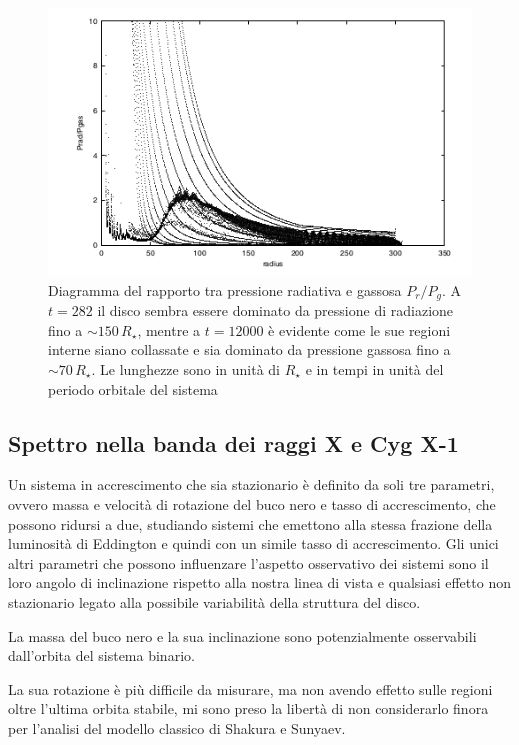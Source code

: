 \documentclass[a4paperbi]{article}
\begin{document}
	\begin{figure}[H]
		\centering
		\includegraphics[width=0.8\linewidth]{CollassoDisco2}
		\caption{Diagramma del rapporto tra pressione radiativa e gassosa $P_r/P_g$. A $t=282$ il disco sembra essere dominato da pressione di radiazione fino a $\sim150\,R_\star$, mentre a $t=12000$ è evidente come le sue regioni interne siano collassate e sia dominato da pressione gassosa fino a $\sim70\,R_\star$. Le lunghezze sono in unità di $R_\star$ e in tempi in unità del periodo orbitale del sistema}
		\label{fig:CollassoDisco2}
	\end{figure}
	
	\subsection{Spettro nella banda dei raggi X e Cyg X-1}
	 
	Un sistema in accrescimento che sia stazionario è definito da soli tre parametri, ovvero massa e velocità di rotazione del buco nero e tasso di accrescimento, che possono ridursi a due, studiando sistemi che emettono alla stessa frazione della luminosità di Eddington e quindi con un simile tasso di accrescimento. Gli unici altri parametri che possono influenzare l'aspetto osservativo dei sistemi sono il loro angolo di inclinazione rispetto alla nostra linea di vista e qualsiasi effetto non stazionario legato alla possibile variabilità della struttura del disco.
	
	La massa del buco nero e la sua inclinazione sono potenzialmente osservabili dall'orbita del sistema binario.
	
	La sua rotazione è più difficile da misurare, ma non avendo effetto sulle regioni oltre l'ultima orbita stabile, mi sono preso la libertà di non considerarlo finora per l'analisi del modello classico di Shakura e Sunyaev.
	
\end{document}
